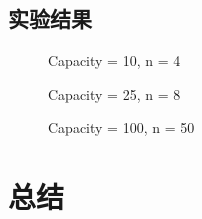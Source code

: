 \documentclass[UTF8,titlepage]{ctexart}
\numberwithin{figure}{section}
\begin{document}
\subsection{实验结果}

\begin{figure}[H]
\centering
 \caption{Capacity = 10, n = 4}
 \label{}
\end{figure}

\begin{figure}[H]
\centering
 \caption{Capacity = 25, n = 8}
 \label{}
\end{figure}

\begin{figure}[H]
\centering
 \caption{Capacity = 100, n = 50}
 \label{}
\end{figure}

\section{总结}
\end{document}
